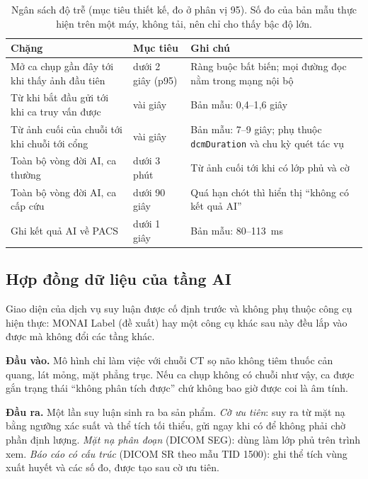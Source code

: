 \begin{table}[H]
\centering
\small
\begin{tabularx}{\textwidth}{@{}Y p{3.0cm} Y@{}}
\toprule
\textbf{Chặng} & \textbf{Mục tiêu} & \textbf{Ghi chú} \\
\midrule
Mở ca chụp gần đây tới khi thấy ảnh đầu tiên & dưới 2 giây (p95) & Ràng buộc bất biến; mọi đường đọc nằm trong mạng nội bộ \\
Từ khi bắt đầu gửi tới khi ca truy vấn được & vài giây & Bản mẫu: 0{,}4--1{,}6 giây \\
Từ ảnh cuối của chuỗi tới khi chuỗi tới cổng & vài giây & Bản mẫu: 7--9 giây; phụ thuộc \texttt{dcmDuration} và chu kỳ quét tác vụ \\
Toàn bộ vòng đời AI, ca thường & dưới 3 phút & Từ ảnh cuối tới khi có lớp phủ và cờ \\
Toàn bộ vòng đời AI, ca cấp cứu & dưới 90 giây & Quá hạn chót thì hiển thị ``không có kết quả AI'' \\
Ghi kết quả AI về PACS & dưới 1 giây & Bản mẫu: 80--113~ms \\
\bottomrule
\end{tabularx}
\caption{Ngân sách độ trễ (mục tiêu thiết kế, đo ở phân vị 95). Số đo của bản mẫu thực
hiện trên một máy, không tải, nên chỉ cho thấy bậc độ lớn.}
\label{tab:latency}
\end{table}

\subsection{Hợp đồng dữ liệu của tầng AI}
\label{sec:aicontract}

Giao diện của dịch vụ suy luận được cố định trước và không phụ thuộc công cụ hiện
thực: MONAI Label (đề xuất) hay một công cụ khác sau này đều lắp vào được mà không đổi
các tầng khác.

\textbf{Đầu vào.} Mô hình chỉ làm việc với chuỗi CT sọ não không tiêm thuốc cản quang,
lát mỏng, mặt phẳng trục. Nếu ca chụp không có chuỗi như vậy, ca được gắn trạng thái
``không phân tích được'' chứ không bao giờ được coi là âm tính.

\textbf{Đầu ra.} Một lần suy luận sinh ra ba sản phẩm. \emph{Cờ ưu tiên}: suy ra từ mặt
nạ bằng ngưỡng xác suất và thể tích tối thiểu, gửi ngay khi có để không phải chờ phần định
lượng. \emph{Mặt nạ phân đoạn} (DICOM SEG): dùng làm lớp phủ trên trình xem.
\emph{Báo cáo có cấu trúc} (DICOM SR theo mẫu TID 1500): ghi thể tích vùng xuất huyết và
các số đo, được tạo sau cờ ưu tiên.

